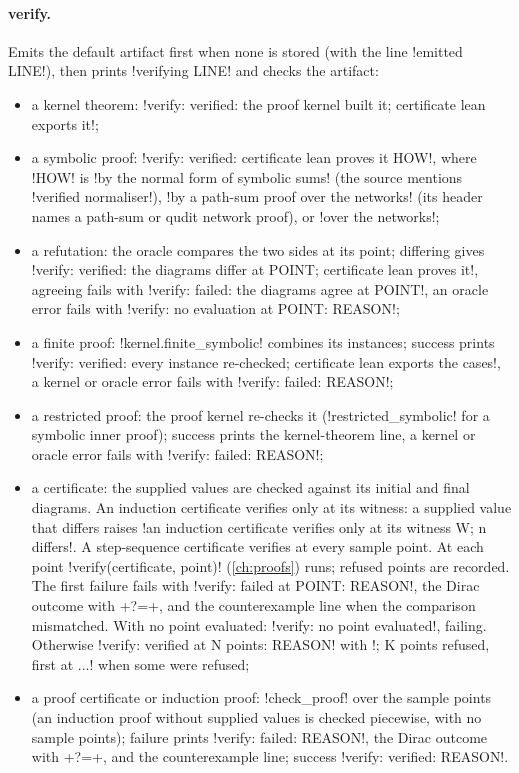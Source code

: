 \paragraph{verify.} Emits the default artifact first when none is stored (with the line \code!emitted LINE!), then prints \code!verifying LINE! and checks the artifact:
\begin{itemize}
\item a kernel theorem: \code!verify: verified: the proof kernel built it; certificate lean exports it!;
\item a symbolic proof: \code!verify: verified: certificate lean proves it HOW!, where \code!HOW! is \code!by the normal form of symbolic sums! (the source mentions \code!verified normaliser!), \code!by a path-sum proof over the networks! (its header names a path-sum or qudit network proof), or \code!over the networks!;
\item a refutation: the oracle compares the two sides at its point; differing gives \code!verify: verified: the diagrams differ at POINT; certificate lean proves it!, agreeing fails with \code!verify: failed: the diagrams agree at POINT!, an oracle error fails with \code!verify: no evaluation at POINT: REASON!;
\item a finite proof: \py!kernel.finite_symbolic! combines its instances; success prints \code!verify: verified: every instance re-checked; certificate lean exports the cases!, a kernel or oracle error fails with \code!verify: failed: REASON!;
\item a restricted proof: the proof kernel re-checks it (\py!restricted_symbolic! for a symbolic inner proof); success prints the kernel-theorem line, a kernel or oracle error fails with \code!verify: failed: REASON!;
\item a certificate: the supplied values are checked against its initial and final diagrams. An induction certificate verifies only at its witness: a supplied value that differs raises \code!an induction certificate verifies only at its witness W; n differs!. A step-sequence certificate verifies at every sample point. At each point \py!verify(certificate, point)! (\cref{ch:proofs}) runs; refused points are recorded. The first failure fails with \code!verify: failed at POINT: REASON!, the Dirac outcome with \code+?=+, and the counterexample line when the comparison mismatched. With no point evaluated: \code!verify: no point evaluated!, failing. Otherwise \code!verify: verified at N points: REASON! with \code!; K points refused, first at ...! when some were refused;
\item a proof certificate or induction proof: \py!check_proof! over the sample points (an induction proof without supplied values is checked piecewise, with no sample points); failure prints \code!verify: failed: REASON!, the Dirac outcome with \code+?=+, and the counterexample line; success \code!verify: verified: REASON!.
\end{itemize}

